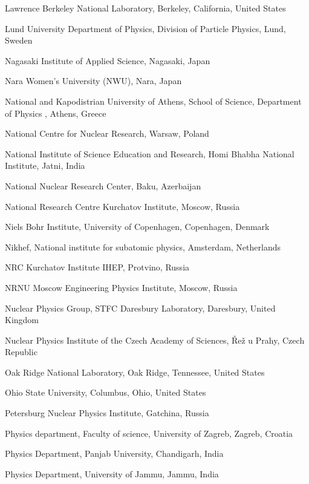 \begin{flushleft}
\begin{Authlist}
\item {}Lawrence Berkeley National Laboratory, Berkeley, California, United States
\item {}Lund University Department of Physics, Division of Particle Physics, Lund, Sweden
\item {}Nagasaki Institute of Applied Science, Nagasaki, Japan
\item {}Nara Women{'}s University (NWU), Nara, Japan
\item {}National and Kapodistrian University of Athens, School of Science, Department of Physics , Athens, Greece
\item {}National Centre for Nuclear Research, Warsaw, Poland
\item {}National Institute of Science Education and Research, Homi Bhabha National Institute, Jatni, India
\item {}National Nuclear Research Center, Baku, Azerbaijan
\item {}National Research Centre Kurchatov Institute, Moscow, Russia
\item {}Niels Bohr Institute, University of Copenhagen, Copenhagen, Denmark
\item {}Nikhef, National institute for subatomic physics, Amsterdam, Netherlands
\item {}NRC Kurchatov Institute IHEP, Protvino, Russia
\item {}NRNU Moscow Engineering Physics Institute, Moscow, Russia
\item {}Nuclear Physics Group, STFC Daresbury Laboratory, Daresbury, United Kingdom
\item {}Nuclear Physics Institute of the Czech Academy of Sciences, \v{R}e\v{z} u Prahy, Czech Republic
\item {}Oak Ridge National Laboratory, Oak Ridge, Tennessee, United States
\item {}Ohio State University, Columbus, Ohio, United States
\item {}Petersburg Nuclear Physics Institute, Gatchina, Russia
\item {}Physics department, Faculty of science, University of Zagreb, Zagreb, Croatia
\item {}Physics Department, Panjab University, Chandigarh, India
\item {}Physics Department, University of Jammu, Jammu, India

\end{Authlist}
\end{flushleft}
